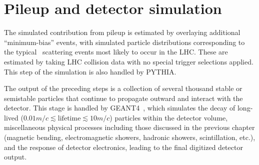 \section{Pileup and detector simulation} \label{sec:simulation_detector}
The simulated contribution from pileup is estimated by overlaying additional ``minimum-bias'' events, with simulated particle distributions
corresponding to the typical \Pp\Pp\ scattering events most likely to occur in the LHC. These are estimated by taking LHC collision data with no
special trigger selections applied. This step of the simulation is also handled by PYTHIA.

The output of the preceding steps is a collection of several thousand stable or semistable particles that continue to propagate outward and interact
with the detector. This stage is handled by GEANT4~\cite{ref:S0168-9002(03)01368-8}, which simulates the decay of long-lived
($0.01\unit{m}/c \lesssim \mathrm{lifetime} \lesssim 10\unit{m}/c$) particles within the detector volume, miscellaneous physical processes including those
discussed in the previous chapter (magnetic bending, electromagnetic showers, hadronic showers, scintillation, etc.), and the response of detector electronics,
leading to the final digitized detector output.
